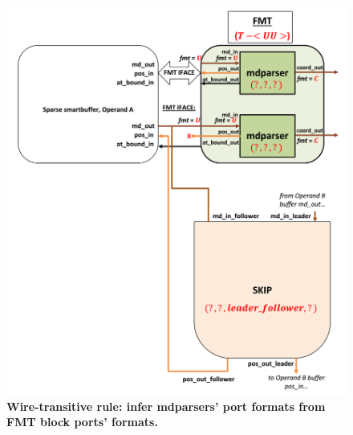 \begin{figure}[ht]
\includegraphics[width=\textwidth]{figures/safinference_build_04mdparserportfmt.png}
\caption{\textbf{Wire-transitive rule: infer mdparsers' port formats from FMT block ports' formats.}}
\label{fig:safinference_build_04mdparserportfmt}
\centering
\end{figure}



